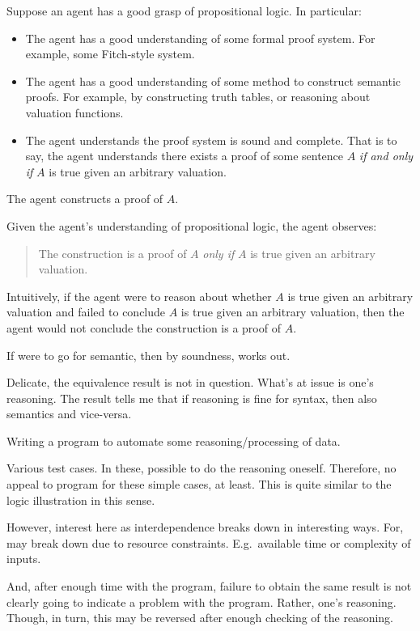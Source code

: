\begin{note}
  \begin{scenario}
    \label{illu:sketch:prop-logic}
    Suppose an agent has a good grasp of propositional logic.
    In particular:
    \begin{itemize}
    \item
      The agent has a good understanding of some formal proof system.
      For example, some Fitch-style system.
    \item
      The agent has a good understanding of some method to construct semantic proofs.
      For example, by constructing truth tables, or reasoning about valuation functions.
    \item
      The agent understands the proof system is sound and complete.
      That is to say, the agent understands there exists a proof of some sentence \(A\) \emph{if and only if} \(A\) is true given an arbitrary valuation.
    \end{itemize}
    The agent constructs a proof of \(A\).

    Given the agent's understanding of propositional logic, the agent observes:
    \begin{quote}
      The construction is a proof of \(A\) \emph{only if} \(A\) is true given an arbitrary valuation.
    \end{quote}
  \end{scenario}

  Intuitively, if the agent were to reason about whether \(A\) is true given an arbitrary valuation and failed to conclude \(A\) is true given an arbitrary valuation, then the agent would not conclude the construction is a proof of \(A\).

  If were to go for semantic, then by soundness, works out.
\end{note}

\begin{note}[Interest]
  Delicate, the equivalence result is not in question.
  What's at issue is one's reasoning.
  The result tells me that if reasoning is fine for syntax, then also semantics and vice-versa.
\end{note}

\begin{note}[Programming]
  \begin{scenario}
    \label{illu:programming}
    Writing a program to automate some reasoning/processing of data.
  \end{scenario}
  Various test cases.
  In these, possible to do the reasoning oneself.
  Therefore, no appeal to program for these simple cases, at least.
  This is quite similar to the logic illustration in this sense.

  However, interest here as interdependence breaks down in interesting ways.
  For, may break down due to resource constraints.
  E.g.\ available time or complexity of inputs.

  And, after enough time with the program, failure to obtain the same result is not clearly going to indicate a problem with the program.
  Rather, one's reasoning.
  Though, in turn, this may be reversed after enough checking of the reasoning.
\end{note}

